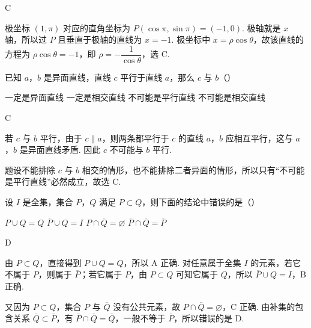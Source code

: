 \begin{answer}
C
\end{answer}

\begin{solution}
极坐标 \((1,\pi)\) 对应的直角坐标为 \(P(\cos\pi,\sin\pi)=(-1,0)\). 极轴就是 \(x\) 轴，所以过 \(P\) 且垂直于极轴的直线为 \(x=-1\). 极坐标中 \(x=\rho\cos\theta\)，故该直线的方程为 \(\rho\cos\theta=-1\)，即 \(\rho=-\dfrac{1}{\cos\theta}\)，选 C.
\end{solution}

\begin{problem}
已知 \(a\)，\(b\) 是异面直线，直线 \(c\) 平行于直线 \(a\)，那么 \(c\) 与 \(b\)（\quad）

\choices
    {一定是异面直线}
    {一定是相交直线}
    {不可能是平行直线}
    {不可能是相交直线}
\end{problem}

\begin{answer}
C
\end{answer}

\begin{solution}
若 \(c\) 与 \(b\) 平行，由于 \(c\parallel a\)，则两条都平行于 \(c\) 的直线 \(a\)，\(b\) 应相互平行，这与 \(a\)，\(b\) 是异面直线矛盾. 因此 \(c\) 不可能与 \(b\) 平行.

题设不能排除 \(c\) 与 \(b\) 相交的情形，也不能排除二者异面的情形，所以只有“不可能是平行直线”必然成立，故选 C.
\end{solution}

\begin{problem}
设 \(I\) 是全集，集合 \(P\)，\(Q\) 满足 \(P \subset Q\)，则下面的结论中错误的是（\quad）

\choices
    {\(P \cup Q = Q\)}
    {\(\overline{P} \cup Q = I\)}
    {\(P \cap \overline{Q} = \varnothing\)}
    {\(\overline{P} \cap \overline{Q} = \overline{P}\)}
\end{problem}

\begin{answer}
D
\end{answer}

\begin{solution}
由 \(P\subset Q\)，直接得到 \(P\cup Q=Q\)，所以 A 正确. 对任意属于全集 \(I\) 的元素，若它不属于 \(P\)，则属于 \(\overline P\)；若它属于 \(P\)，由 \(P\subset Q\) 可知它属于 \(Q\)，所以 \(\overline P\cup Q=I\)，B 正确.

又因为 \(P\subset Q\)，集合 \(P\) 与 \(\overline Q\) 没有公共元素，故 \(P\cap\overline Q=\varnothing\)，C 正确. 由补集的包含关系 \(\overline Q\subset\overline P\)，有 \(\overline P\cap\overline Q=\overline Q\)，一般不等于 \(\overline P\)，所以错误的是 D.
\end{solution}

